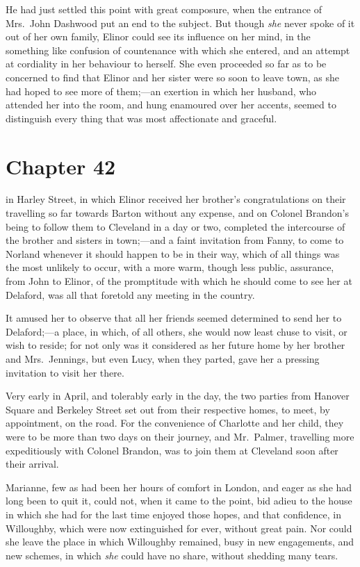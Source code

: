 He had just settled this point with great composure,
when the entrance of Mrs.\ John Dashwood put an end to the
subject.
But though \emph{she} never spoke of it out of her own family,
Elinor could see its influence on her mind, in the something
like confusion of countenance with which she entered,
and an attempt at cordiality in her behaviour to herself.
She even proceeded so far as to be concerned to find
that Elinor and her sister were so soon to leave town,
as she had hoped to see more of them;---an exertion
in which her husband, who attended her into the room,
and hung enamoured over her accents, seemed to distinguish
every thing that was most affectionate and graceful.



\chapter{Chapter 42}


 in Harley Street, in which Elinor
received her brother's congratulations on their travelling
so far towards Barton without any expense, and on Colonel
Brandon's being to follow them to Cleveland in a day or two,
completed the intercourse of the brother and sisters
in town;---and a faint invitation from Fanny, to come
to Norland whenever it should happen to be in their way,
which of all things was the most unlikely to occur,
with a more warm, though less public, assurance, from John
to Elinor, of the promptitude with which he should come
to see her at Delaford, was all that foretold any meeting
in the country.

It amused her to observe that all her friends seemed
determined to send her to Delaford;---a place, in which,
of all others, she would now least chuse to visit,
or wish to reside; for not only was it considered as
her future home by her brother and Mrs.\ Jennings, but even Lucy,
when they parted, gave her a pressing invitation to visit her there.

Very early in April, and tolerably early in the day,
the two parties from Hanover Square and Berkeley Street set
out from their respective homes, to meet, by appointment,
on the road.  For the convenience of Charlotte and her child,
they were to be more than two days on their journey,
and Mr.\ Palmer, travelling more expeditiously with Colonel Brandon,
was to join them at Cleveland soon after their arrival.

Marianne, few as had been her hours of comfort
in London, and eager as she had long been to quit it,
could not, when it came to the point, bid adieu to
the house in which she had for the last time enjoyed
those hopes, and that confidence, in Willoughby,
which were now extinguished for ever, without great pain.
Nor could she leave the place in which Willoughby remained,
busy in new engagements, and new schemes, in which \emph{she}
could have no share, without shedding many tears.

